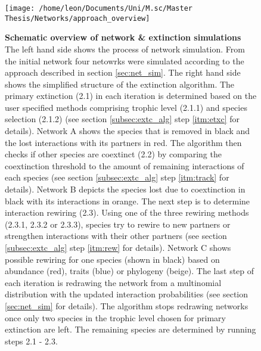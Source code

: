 \documentclass[12pt,a4paper]{article}
\begin{document}
	\begin{figure}[H]
	 \texttt{[image: /home/leon/Documents/Uni/M.sc/Master Thesis/Networks/approach\_overview]}
	 \caption{\textbf{Schematic overview of network \& extinction simulations} The left hand side shows the process of network simulation. From the initial network four netowrks were simulated according to the approach described in section \ref{sec:net_sim}. The right hand side shows the simplified structure of the extinction algorithm. The primary extinction (2.1) in each iteration is determined based on the user specified methods comprising trophic level (2.1.1) and species selection (2.1.2) (see section \ref{subsec:extc_alg} step \ref{itm:etxc} for details). Network A shows the species that is removed in black and the lost interactions with its partners in red. The algorithm then checks if other species are coextinct (2.2) by comparing the coextinction threshold to the amount of remaining interactions of each species (see section \ref{subsec:extc_alg} step \ref{itm:track} for details). Network B depicts the species lost due to coextinction in black with its interactions in orange. The next step is to determine interaction rewiring (2.3). Using one of the three rewiring methods (2.3.1, 2.3.2 or 2.3.3), species try to rewire to new partners or strengthen interactions with their other partners (see section \ref{subsec:extc_alg} step \ref{itm:rew} for details). Network C shows possible rewiring for one species (shown in black) based on abundance (red), traits (blue) or phylogeny (beige).
	 The last step of each iteration is redrawing the network from a multinomial distribution with the updated interaction probabilities (see section \ref{sec:net_sim} for details). The algorithm stops redrawing networks once only two species in the trophic level chosen for primary extinction are left. The remaining species are determined by running steps 2.1 - 2.3.}
	 \label{fig:extc_alg}
\end{figure}
	
\end{document}
